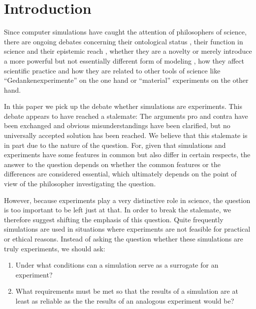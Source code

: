\documentclass[12pt, a4paper]{article}
\numberwithin{equation}{section}
\begin{document}
\tableofcontents

\onehalfspacing

\section{Introduction}

Since computer simulations have caught the attention of philosophers
of science, there are ongoing debates concerning their ontological
status \citep{barberousse-et-al:2009}, their function in science and
their epistemic reach \citep{humphreys:2004}, whether they are a
novelty or merely introduce a more powerful but not essentially
different form of modeling \citep{frigg-reiss:2009, humphreys:2009},
how they affect scientific practice \citep{winsberg:2010} and how they
are related to other tools of science like ``Gedankenexperimente'' on
the one hand
or ``material'' experiments on the other hand.

In this paper we pick up the debate whether simulations are
experiments.  This debate appears to have reached a stalemate: The
arguments pro and contra have been exchanged \citep{guala:2002,
  morgan:2003, parker:2009, winsberg:2009, morrison:2009} and obvious
misunderstandings have been clarified, but no universally accepted
solution has been reached. We believe that this stalemate is in part
due to the nature of the question. For, given that simulations and
experiments have some features in common but also differ in certain
respects, the answer to the question depends on whether the common
features or the differences are considered essential, which ultimately
depends on the point of view of the philosopher investigating the
question.

However, because experiments play a very distinctive role in science,
the question is too important to be left just at that. In order to break
the stalemate, we therefore suggest shifting the emphasis of this
question. Quite frequently simulations are used in situations where
experiments are not feasible for practical or ethical reasons. Instead of
asking the question whether these simulations are truly experiments, we
should ask: 

\begin{enumerate}
\item Under what conditions can a simulation serve as a
surrogate for an experiment? 
\item What requirements must be met so
that the results of a simulation are at least as reliable as the the
results of an analogous experiment would be?
\end{enumerate}
\end{document}
